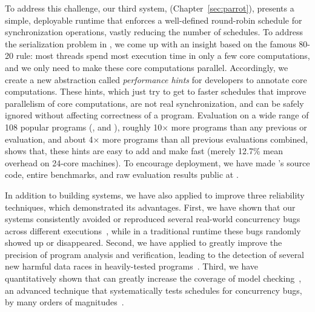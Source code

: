 To address this challenge, our third \smt system, \parrot 
(Chapter~\ref{sec:parrot}), presents a simple, deployable runtime that enforces 
a well-defined round-robin schedule for synchronization operations, vastly 
reducing the number of schedules. To address the serialization problem in \smt, 
we come up with an insight based on the famous 80-20 rule: most threads spend 
most execution time in only a few core computations, and we only need to make 
these core computations parallel. Accordingly, we create a new abstraction 
called \emph{performance hints} for developers to annotate core computations. 
These hints, which just try to get to faster schedules that improve parallelism 
of core computations, are not real synchronization, and can be safely ignored 
without affecting correctness of a program. Evaluation on a wide range of 108 
popular programs (\eg, \bdb and \mplayer), roughly 10$\times$ more programs 
than any previous \smt or \dmt evaluation, and about 4$\times$ more programs 
than all previous evaluations combined, shows that, these hints are easy to add 
and make \parrot fast (merely 12.7\% mean overhead on 24-core machines). To 
encourage \smt deployment, we have made \parrot's source code, entire 
benchmarks, and raw evaluation results public at \github.

In addition to building \smt systems, we have also applied \smt to 
improve three reliability techniques, which demonstrated its advantages. First, 
we have shown that our \smt systems consistently avoided or reproduced several 
real-world concurrency bugs across different executions~\cite{cui:tern:osdi10, 
peregrine:sosp11}, while in a traditional \pthread runtime these bugs randomly 
showed up or disappeared. Second, we have applied \smt to greatly improve the 
precision of program analysis and verification, leading to the detection of 
several new harmful data races in heavily-tested programs~\cite{wu:pldi12}. 
Third, we have quantitatively shown that \smt can greatly increase the 
coverage of model checking~\cite{demeter:sosp11, dbug:spin11, modist:nsdi09}, 
an advanced technique that systematically tests schedules for concurrency bugs, 
by many orders of magnitudes~\cite{parrot:sosp13}.



